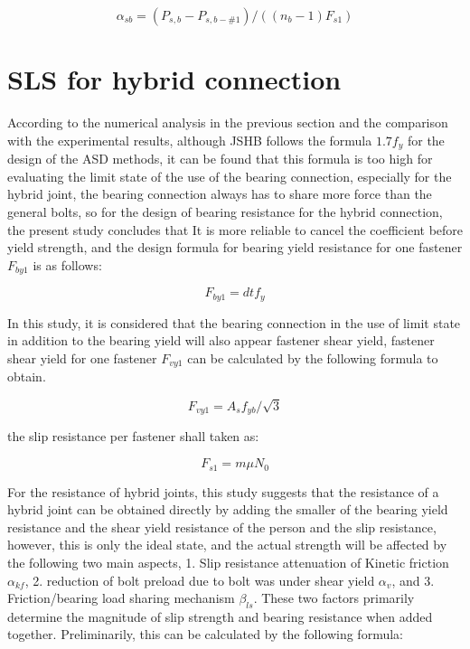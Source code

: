 \begin{equation} \label{eq-asb}
    \alpha_{sb}=(P_{s,b}-P_{s,b-\#1})/((n_b-1) F_{s1})
\end{equation}






\section{SLS for hybrid connection}

According to the numerical analysis in the previous section and the comparison with the experimental results, although JSHB follows the formula $1.7f_y$ for the design of the \ac{ASD} methods, it can be found that this formula is too high for evaluating the limit state of the use of the bearing connection, especially for the hybrid joint, the bearing connection always has to share more force than the general bolts, so for the design of bearing resistance for the hybrid connection, the present study concludes that It is more reliable to cancel the coefficient before yield strength, and the design formula for bearing yield resistance for one fastener $F_{by1}$ is as follows:

\begin{equation}
    F_{by1} = dtf_y
\end{equation}

In this study, it is considered that the bearing connection in the use of limit state in addition to the bearing yield will also appear fastener shear yield, fastener shear yield for one fastener $F_{vy1}$ can be calculated by the following formula to obtain.

\begin{equation}
    F_{vy1} = A_s f_{yb}/\sqrt{3}
\end{equation}

the slip resistance per fastener shall taken as:

\begin{equation}
    F_{s1} = m \mu N_0
\end{equation}


For the resistance of hybrid joints, this study suggests that the resistance of a hybrid joint can be obtained directly by adding the smaller of the bearing yield resistance and the shear yield resistance of the person and the slip resistance, however, this is only the ideal state, and the actual strength will be affected by the following two main aspects, 1. Slip resistance attenuation of Kinetic friction $\alpha_{kf}$, 2. reduction of bolt preload due to bolt was under shear yield $\alpha_{v}$, and 3. Friction/bearing load sharing mechanism $\beta_{ls}$. These two factors primarily determine the magnitude of slip strength and bearing resistance when added together. Preliminarily, this can be calculated by the following formula:

